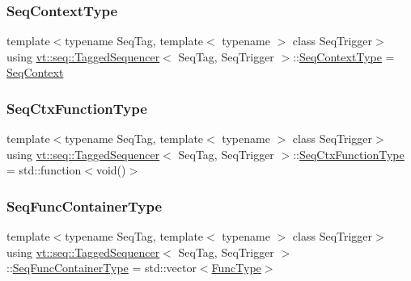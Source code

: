 \subsubsection{\texorpdfstring{Seq\+Context\+Type}{SeqContextType}}
{\footnotesize\ttfamily template$<$typename Seq\+Tag, template$<$ typename $>$ class Seq\+Trigger$>$ \\
using \hyperlink{structvt_1_1seq_1_1_tagged_sequencer}{vt\+::seq\+::\+Tagged\+Sequencer}$<$ Seq\+Tag, Seq\+Trigger $>$\+::\hyperlink{structvt_1_1seq_1_1_tagged_sequencer_a73020a327d57aa8eac042e558b1b2e30}{Seq\+Context\+Type} =  \hyperlink{structvt_1_1seq_1_1_seq_context}{Seq\+Context}}

\mbox{\label{structvt_1_1seq_1_1_tagged_sequencer_ad8a1ed9b8c012cf2a73ebd2e46d6d899}} 
\subsubsection{\texorpdfstring{Seq\+Ctx\+Function\+Type}{SeqCtxFunctionType}}
{\footnotesize\ttfamily template$<$typename Seq\+Tag, template$<$ typename $>$ class Seq\+Trigger$>$ \\
using \hyperlink{structvt_1_1seq_1_1_tagged_sequencer}{vt\+::seq\+::\+Tagged\+Sequencer}$<$ Seq\+Tag, Seq\+Trigger $>$\+::\hyperlink{structvt_1_1seq_1_1_tagged_sequencer_ad8a1ed9b8c012cf2a73ebd2e46d6d899}{Seq\+Ctx\+Function\+Type} =  std\+::function$<$void()$>$}

\mbox{\label{structvt_1_1seq_1_1_tagged_sequencer_a3843fac93a70e2d9375b33515938696f}} 
\subsubsection{\texorpdfstring{Seq\+Func\+Container\+Type}{SeqFuncContainerType}}
{\footnotesize\ttfamily template$<$typename Seq\+Tag, template$<$ typename $>$ class Seq\+Trigger$>$ \\
using \hyperlink{structvt_1_1seq_1_1_tagged_sequencer}{vt\+::seq\+::\+Tagged\+Sequencer}$<$ Seq\+Tag, Seq\+Trigger $>$\+::\hyperlink{structvt_1_1seq_1_1_tagged_sequencer_a3843fac93a70e2d9375b33515938696f}{Seq\+Func\+Container\+Type} =  std\+::vector$<$\hyperlink{namespacevt_1_1seq_a26c632e5cbf02395a8bbd9aa4c761232}{Func\+Type}$>$}

